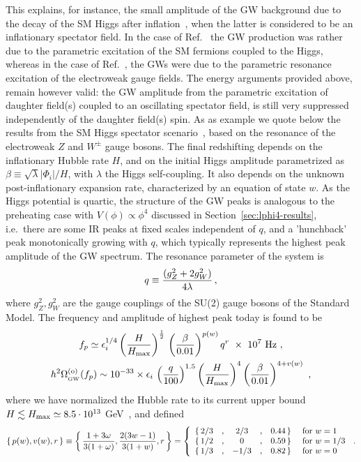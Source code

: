 \documentclass[a4paper,11pt]{article}
\newcommand{\be}{\begin{equation}}
\newcommand{\ee}{\end{equation}}
\newcommand{\bea}{\begin{eqnarray}}
\newcommand{\eea}{\end{eqnarray}}
\newcommand{\GW}{{_{\rm GW}}}
\begin{document}
This explains, for instance, the small amplitude of the GW background due to the decay of the SM Higgs after inflation~\cite{Figueroa:2014aya,Figueroa:2016ojl}, when the latter is considered to be an inflationary spectator field. In the case of Ref.~\cite{Figueroa:2014aya} the GW production was rather due to the parametric excitation of the SM fermions coupled to the Higgs, whereas in the case of Ref.~\cite{Figueroa:2016ojl}, the GWs were due to the parametric resonance excitation of the electroweak gauge fields. The energy arguments provided above, remain however valid: the GW amplitude from the parametric excitation of daughter field(s) coupled to an oscillating spectator field, is still very suppressed independently of the daughter field(s) spin. As as example we quote below the results from the SM Higgs spectator scenario~\cite{Figueroa:2016ojl}, based on the resonance of the electroweak $Z$ and $W^\pm$ gauge bosons. The final redshifting depends on the inflationary Hubble rate $H$, and on the initial Higgs amplitude parametrized as $\beta \equiv \sqrt{\lambda}|\Phi_i|/H$, with $\lambda$ the Higgs self-coupling. It also depends on the unknown post-inflationary expansion rate, characterized by an equation of state $w$. As the Higgs potential is quartic, the structure of the GW peaks is analogous to the preheating case with $V(\phi) \propto \phi^4$ discussed in Section~\ref{sec:lphi4-results}, i.e.~there are some IR peaks at fixed scales independent of $q$, and a 'hunchback' peak monotonically growing with $q$, which typically represents the highest peak amplitude of the GW spectrum. The resonance parameter of the system is 
\begin{eqnarray}
q \equiv {(g_Z^2 + 2g_W^2)\over 4\lambda}\,,
\end{eqnarray} 
where $g_Z^2, g_W^2$ are the gauge couplings of the SU(2) gauge bosons of the Standard Model. The frequency and amplitude of highest peak today is found to be~\cite{Figueroa:2016ojl}
\begin{gather}
f_p \simeq \epsilon_{i}^{1/4} \left(\frac{H}{H_{\rm max}}\right)^{1\over2}\,\left(\frac{\beta}{0.01}\right)^{p(w)} q^{r}~\times~10^{7}~{\rm Hz} \ , \label{eq:SpectFinalFreqPeak}\\
h^{2}\Omega_{\GW}^{\rm (o)}(f_p) \sim 10^{-33}\times \epsilon_{i}\,\left(\frac{q}{100}\right)^{1.5}\left(\frac{H}{H_{\rm max}}\right)^{4}\left(\frac{\beta}{0.01} \right)^{4+v(w)} \ , \label{eq:SpectFinalAmplitudePeak}
\end{gather}
where we have normalized the Hubble rate to its current upper bound $H \lesssim H_{\rm max} \simeq 8.5\cdot 10^{13}$ GeV~\cite{Ade:2015xua}, and defined
\be \lbrace\, p(w),v(w),r \,\rbrace \equiv \left\lbrace\,\frac{1 + 3 \omega}{3 (1 + \omega)},{2(3w-1)\over 3(1+w)},r\,\right\rbrace = \left\{ \begin{array}{cccccl}
        \lbrace\, {2/3} &, & {2/3} &, & 0.44 \,\rbrace & ~\mbox{for}~w = 1\\
        \lbrace\, {1/2} &, & 0 &, & 0.59 \,\rbrace & ~\mbox{for}~w = 1/3\\
        \lbrace\, 1/3 &, & -1/3 &, & 0.82 \,\rbrace & ~\mbox{for}~w = 0 \end{array} \right. \,.\nonumber
    \label{eq:k1fitb}  \ee
    
\end{document}

